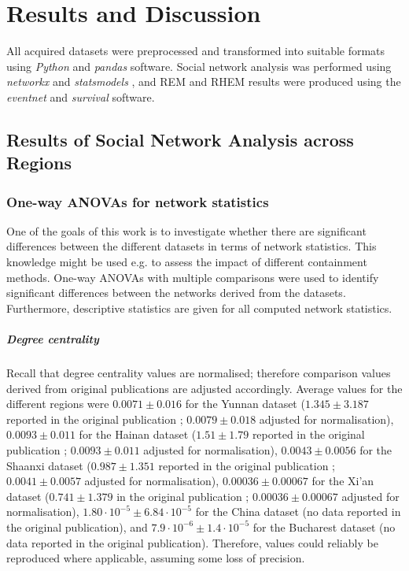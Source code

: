 \chapter{Results and Discussion}
\label{ch:results_discussion}

All acquired datasets were preprocessed and transformed into suitable formats using \emph{Python} \cite{python} and \emph{pandas} \cite{pandas} software. Social network analysis was performed using \emph{networkx} \cite{networkx} and \emph{statsmodels} \cite{seabold2010statsmodels}, and REM and RHEM results were produced using the \emph{eventnet} \cite{eventnet_rem,eventnet_rhem} and \emph{survival} \cite{survival-package} software.

\section{Results of Social Network Analysis across Regions}
\label{sec:res_sna}

\subsection{One-way ANOVAs for network statistics}
\label{sec:sna_anovas}

One of the goals of this work is to investigate whether there are significant differences between the different datasets in terms of network statistics. This knowledge might be used e.g. to assess the impact of different containment methods. One-way ANOVAs with multiple comparisons were used to identify significant differences between the networks derived from the datasets. Furthermore, descriptive statistics are given for all computed network statistics.

\paragraph{Degree centrality} Recall that degree centrality values are normalised; therefore comparison values derived from original publications are adjusted accordingly. Average values for the different regions were $0.0071\pm0.016$ for the Yunnan dataset ($1.345\pm3.187$ reported in the original publication \cite{hainan_publication}; $0.0079\pm0.018$ adjusted for normalisation), $0.0093\pm0.011$ for the Hainan dataset ($1.51\pm1.79$ reported in the original publication \cite{hainan_publication}; $0.0093\pm0.011$ adjusted for normalisation), $0.0043\pm0.0056$ for the Shaanxi dataset ($0.987\pm1.351$ reported in the original publication \cite{shaanxi_publication}; $0.0041\pm0.0057$ adjusted for normalisation), $0.00036\pm0.00067$ for the Xi'an dataset ($0.741\pm1.379$ in the original publication \cite{xian_publication}; $0.00036\pm0.00067$ adjusted for normalisation), $1.80\cdot 10^{-5}\pm6.84\cdot 10^{-5}$ for the China dataset (no data reported in the original publication), and $7.9\cdot 10^{-6}\pm1.4\cdot 10^{-5}$ for the Bucharest dataset (no data reported in the original publication). Therefore, values could reliably be reproduced where applicable, assuming some loss of precision.

